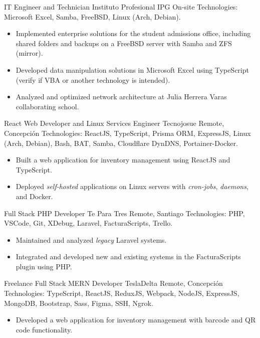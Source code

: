 \documentclass[12pt,letterpaper,sans]{moderncv}
\begin{document}
{IT Engineer and Technician}
{Instituto Profesional IPG}
{\newline On-site}
{\newline Technologies: Microsoft Excel, Samba, FreeBSD, Linux (Arch, Debian).}
{
  \begin{itemize}
    \item Implemented enterprise solutions for the student admissions office, including shared folders and backups on a FreeBSD server with Samba and ZFS (mirror).
    \item Developed data manipulation solutions in Microsoft Excel using TypeScript (verify if VBA or another technology is intended).
    \item Analyzed and optimized network architecture at Julia Herrera Varas collaborating school.
  \end{itemize}
}
\vspace{0.5em}

{React Web Developer and Linux Services Engineer}
{Tecnojosue}
{\newline Remote, Concepción}
{\newline Technologies: ReactJS, TypeScript, Prisma ORM, ExpressJS, Linux (Arch, Debian), Bash, BAT, Samba, Cloudflare DynDNS, Portainer-Docker.}
{
  \begin{itemize}
    \item Built a web application for inventory management using ReactJS and TypeScript.
    \item Deployed \textit{self-hosted} applications on Linux servers with \textit{cron-jobs}, \textit{daemons}, and Docker.
  \end{itemize}
}
\vspace{0.5em}

{Full Stack PHP Developer}
{Te Para Tres}
{\newline Remote, Santiago}
{\newline Technologies: PHP, VSCode, Git, XDebug, Laravel, FacturaScripts, Trello.}
{
  \begin{itemize}
    \item Maintained and analyzed \textit{legacy} Laravel systems.
    \item Integrated and developed new and existing systems in the FacturaScripts plugin using PHP.
  \end{itemize}
}
\vspace{0.5em}

{Freelance Full Stack MERN Developer}
{TeslaDelta}
{\newline Remote, Concepción}
{\newline Technologies: TypeScript, ReactJS, ReduxJS, Webpack, NodeJS, ExpressJS, MongoDB, Bootstrap, Sass, Figma, SSH, Ngrok.}
{
  \begin{itemize}
    \item Developed a web application for inventory management with barcode and QR code functionality.
  \end{itemize}
}
\vspace{0.5em}
\end{document}
